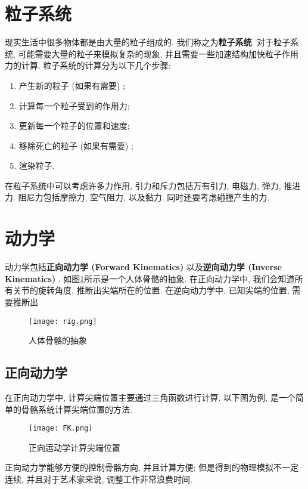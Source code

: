 \documentclass[openany]{progbookcn}
\begin{document}
\section{粒子系统}

现实生活中很多物体都是由大量的粒子组成的. 我们称之为\textbf{粒子系统}. 对于粒子系统, 可能需要大量的粒子来模拟复杂的现象, 并且需要一些加速结构加快粒子作用力的计算. 粒子系统的计算分为以下几个步骤: 
\begin{enumerate}
	\item 产生新的粒子 (如果有需要) ; 
	\item 计算每一个粒子受到的作用力; 
	\item 更新每一个粒子的位置和速度; 
	\item 移除死亡的粒子 (如果有需要) ; 
	\item 渲染粒子. 
\end{enumerate}


在粒子系统中可以考虑许多力作用, 引力和斥力包括万有引力, 电磁力, 弹力, 推进力. 阻尼力包括摩擦力, 空气阻力, 以及黏力. 同时还要考虑碰撞产生的力. 

\section{动力学}

动力学包括\textbf{正向动力学 (Forward Kinematics) }以及\textbf{逆向动力学 (Inverse Kinematics) }. 如图\ref{fig:gg}所示是一个人体骨骼的抽象. 在正向动力学中, 我们会知道所有关节的旋转角度, 推断出尖端所在的位置. 在逆向动力学中, 已知尖端的位置, 需要推断出


\begin{figure}[H]
	\centering
	\texttt{[image: rig.png]}
	\caption{人体骨骼的抽象}
	\label{fig:gg}
\end{figure}

\subsection{正向动力学}

在正向动力学中, 计算尖端位置主要通过三角函数进行计算. 以下图为例, 是一个简单的骨骼系统计算尖端位置的方法. 

\begin{figure}[H]
	\centering
	\texttt{[image: FK.png]}
	\caption{正向运动学计算尖端位置}
	\label{fig:fk}
\end{figure}

正向动力学能够方便的控制骨骼方向, 并且计算方便; 但是得到的物理模拟不一定连续, 并且对于艺术家来说, 调整工作非常浪费时间. 
\end{document}
